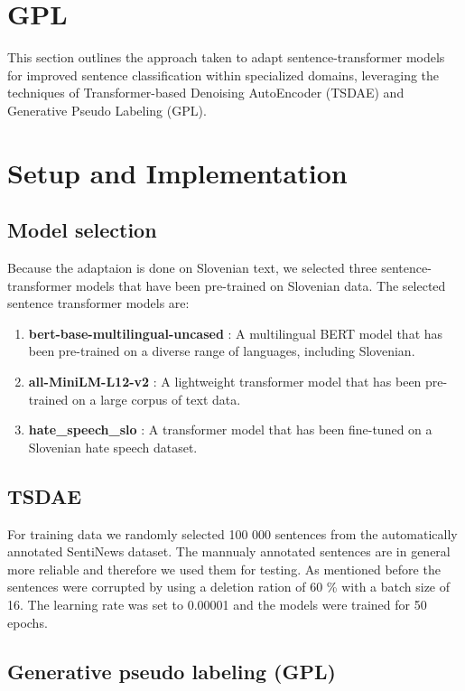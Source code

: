 \documentclass[fleqn,moreauthors,10pt]{ds_report}
\begin{document}
\section*{GPL}

This section outlines the approach taken to adapt sentence-transformer models for improved sentence classification within specialized domains, leveraging the techniques of Transformer-based Denoising AutoEncoder (TSDAE) and Generative Pse\-udo Labeling (GPL).

\section*{Setup and Implementation}
\label{evaluation}

\subsection*{Model selection}
Because the adaptaion is done on Slovenian text, we selected three sentence-transformer models that have been pre-trained on Slovenian data.
The selected sentence transformer models are:
\begin{enumerate}
    \item \textbf{bert-base-multilingual-uncased} \cite{bert}: A multilingual BERT model that has been pre-trained on a diverse range of languages, including Slovenian.
    \item \textbf{all-MiniLM-L12-v2} \cite{miniLM}: A lightweight transformer model that has been pre-trained on a large corpus of text data.
    \item \textbf{hate\_speech\_slo} \cite{hate-speech}: A transformer model that has been fine-tuned on a Slovenian hate speech dataset.
\end{enumerate}


\subsection*{TSDAE}
For training data we randomly selected 100 000 sentences from the automatically annotated SentiNews dataset.
The mannualy annotated sentences are in general more reliable and therefore we used them for testing.
As mentioned before the sentences were corrupted by using a deletion ration of 60 \% with a batch size  of 16.
The learning rate was set to 0.00001 and the models were trained for 50 epochs.





\subsection*{Generative pseudo labeling (GPL)}
\end{document}
